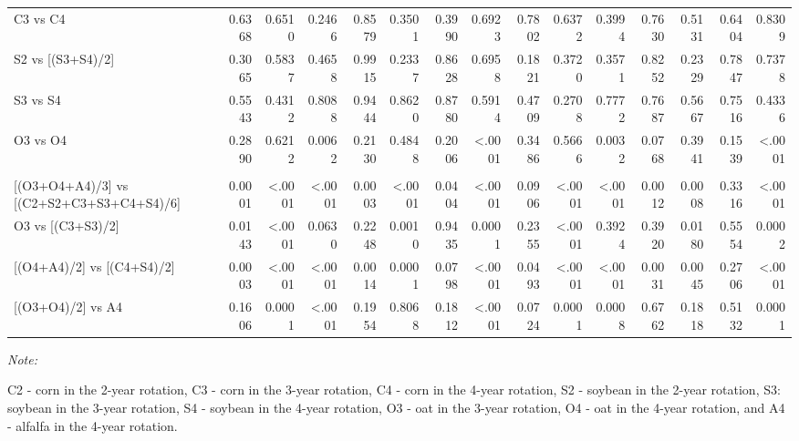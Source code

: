 \documentclass[
]{article}
\begin{document}
\begin{landscape}
\begin{table}
{\begin{threeparttable}
\begin{tabular}[t]{lrrrrrr>{}r|rrrrrrr}
\hspace{1em}C3 vs C4 & 0.6368 & 0.6510 & 0.2466 & 0.8579 & 0.3501 & 0.3990 & 0.6923 & 0.7802 & 0.6372 & 0.3994 & 0.7630 & 0.5131 & 0.6404 & 0.8309\\
\hspace{1em}S2 vs [(S3+S4)/2] & 0.3065 & 0.5837 & 0.4658 & 0.9915 & 0.2337 & 0.8628 & 0.6958 & 0.1821 & 0.3720 & 0.3571 & 0.8252 & 0.2329 & 0.7847 & 0.7378\\
\hspace{1em}S3 vs S4 & 0.5543 & 0.4312 & 0.8088 & 0.9444 & 0.8620 & 0.8780 & 0.5914 & 0.4709 & 0.2708 & 0.7772 & 0.7687 & 0.5667 & 0.7516 & 0.4336\\
\hspace{1em}O3 vs O4 & 0.2890 & 0.6212 & 0.0062 & 0.2130 & 0.4848 & 0.2006 & <.0001 & 0.3486 & 0.5666 & 0.0032 & 0.0768 & 0.3941 & 0.1539 & <.0001\\
\addlinespace[0.3em]
\multicolumn{15}{l}{\textbf{(C) - Crop type effects}}\\
\hspace{1em}{}[(O3+O4+A4)/3] vs [(C2+S2+C3+S3+C4+S4)/6] & 0.0001 & <.0001 & <.0001 & 0.0003 & <.0001 & 0.0404 & <.0001 & 0.0906 & <.0001 & <.0001 & 0.0012 & 0.0008 & 0.3316 & <.0001\\
\hspace{1em}O3 vs [(C3+S3)/2] & 0.0143 & <.0001 & 0.0630 & 0.2248 & 0.0010 & 0.9435 & 0.0001 & 0.2355 & <.0001 & 0.3924 & 0.3920 & 0.0180 & 0.5554 & 0.0002\\
\hspace{1em}{}[(O4+A4)/2] vs [(C4+S4)/2] & 0.0003 & <.0001 & <.0001 & 0.0014 & 0.0001 & 0.0798 & <.0001 & 0.0493 & <.0001 & <.0001 & 0.0031 & 0.0045 & 0.2706 & <.0001\\
\hspace{1em}{}[(O3+O4)/2] vs A4 & 0.1606 & 0.0001 & <.0001 & 0.1954 & 0.8068 & 0.1812 & <.0001 & 0.0724 & 0.0001 & 0.0008 & 0.6762 & 0.1818 & 0.5132 & 0.0001\\
\bottomrule
\end{tabular}
\begin{tablenotes}[para]
\item \textit{Note: } 
\item C2 - corn in the 2-year rotation, C3 - corn in the 3-year rotation, C4 - corn in the 4-year rotation, S2 - soybean in the 2-year rotation, S3: soybean in the 3-year rotation, S4 - soybean in the 4-year rotation, O3 - oat in the 3-year rotation, O4 - oat in the 4-year rotation, and A4 - alfalfa in the 4-year rotation.
\end{tablenotes}
\end{threeparttable}}
\end{table}
\end{landscape}
\end{document}
